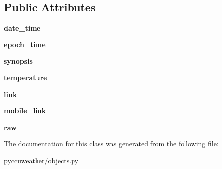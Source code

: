 \subsection*{Public Attributes}
\begin{DoxyCompactItemize}
\item 
\hypertarget{classpyccuweather_1_1objects_1_1_observation_a362b6721e246f2717a7e8e3919fbf69a}{}{\bfseries date\+\_\+time}\label{classpyccuweather_1_1objects_1_1_observation_a362b6721e246f2717a7e8e3919fbf69a}

\item 
\hypertarget{classpyccuweather_1_1objects_1_1_observation_af669838251f2ce9fb212eb1a09c23094}{}{\bfseries epoch\+\_\+time}\label{classpyccuweather_1_1objects_1_1_observation_af669838251f2ce9fb212eb1a09c23094}

\item 
\hypertarget{classpyccuweather_1_1objects_1_1_observation_aa311068344ac25e4788bc5c8e68d2f14}{}{\bfseries synopsis}\label{classpyccuweather_1_1objects_1_1_observation_aa311068344ac25e4788bc5c8e68d2f14}

\item 
\hypertarget{classpyccuweather_1_1objects_1_1_observation_ad6c6b3bdf1c2b9d224f3d7478f57bc02}{}{\bfseries temperature}\label{classpyccuweather_1_1objects_1_1_observation_ad6c6b3bdf1c2b9d224f3d7478f57bc02}

\item 
\hypertarget{classpyccuweather_1_1objects_1_1_observation_a7a35bdfb9d10219d70fbdea32d732be5}{}{\bfseries link}\label{classpyccuweather_1_1objects_1_1_observation_a7a35bdfb9d10219d70fbdea32d732be5}

\item 
\hypertarget{classpyccuweather_1_1objects_1_1_observation_a7f66f75b110a011e1bb71856292a1056}{}{\bfseries mobile\+\_\+link}\label{classpyccuweather_1_1objects_1_1_observation_a7f66f75b110a011e1bb71856292a1056}

\item 
\hypertarget{classpyccuweather_1_1objects_1_1_observation_a74a072536980091fdf545c6c013d30f1}{}{\bfseries raw}\label{classpyccuweather_1_1objects_1_1_observation_a74a072536980091fdf545c6c013d30f1}

\end{DoxyCompactItemize}


The documentation for this class was generated from the following file\+:\begin{DoxyCompactItemize}
\item 
pyccuweather/objects.\+py\end{DoxyCompactItemize}

